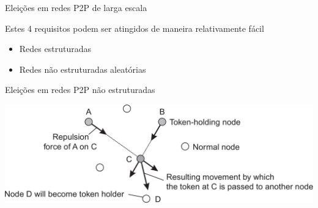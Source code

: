 \documentclass[compress]{beamer}
\begin{document}

\begin{frame}{Eleições em redes P2P de larga escala}

Estes 4 requisitos podem ser atingidos de maneira relativamente fácil
\begin{itemize}
    \item Redes estruturadas
    \item Redes não estruturadas aleatórias
\end{itemize}

\end{frame}


\begin{frame}{Eleições em redes P2P não estruturadas}

\vspace{1cm}

\centering \includegraphics[width=\textwidth]{images/nao-estruturadas.png} 
\end{frame}
\end{document}
